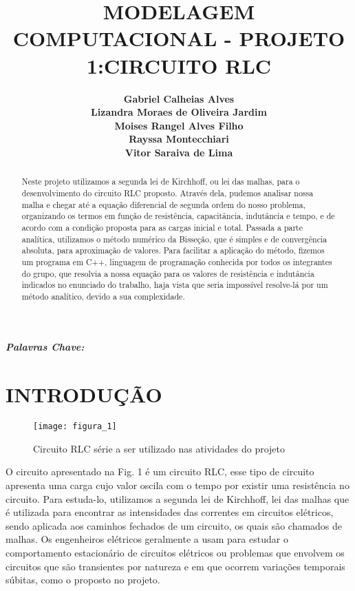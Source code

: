 \documentclass[12pt,fleqn]{article}
\title{MODELAGEM COMPUTACIONAL - PROJETO 1:CIRCUITO RLC}
\author
    {\rm \begin{tabular}{l} 
    \textbf{Gabriel Calheias Alves}\\
    \textbf{Lizandra Moraes de Oliveira Jardim}\\
    \textbf{Moises Rangel Alves Filho}\\
    \textbf{Rayssa Montecchiari}\\
    \textbf{Vitor Saraiva de Lima}\\
  \end{tabular}}
\begin{document}
\pagestyle{pagetstyle}
\maketitle
\thispagestyle{firspagetstyle}

\begin{abstract}
Neste projeto utilizamos a segunda lei de Kirchhoff, ou lei das malhas, para o desenvolvimento do circuito RLC proposto. Através dela, pudemos analisar nossa malha e chegar até a equação diferencial de segunda ordem do nosso problema, organizando os termos em função de resistência, capacitância, indutância e tempo, e de acordo com a condição proposta para as cargas inicial e total. Passada a parte analítica, utilizamos o método numérico da Bisseção, que é simples e de convergência absoluta, para aproximação de valores. Para facilitar a aplicação do método, fizemos um programa em C++, linguagem de programação conhecida por todos os integrantes do grupo, que resolvia a nossa equação para os valores de resistência e indutância indicados no enunciado do trabalho, haja vista que seria impossível resolve-lá por um método analítico, devido a sua complexidade.
\end{abstract}

\textbf{\textit{Palavras Chave:}} 

\pagestyle{fancy}

\section{INTRODUÇÃO}
\begin{figure}[H] %
\vspace{-2pt}
\begin{center}
\texttt{[image: figura\_1]}%
\caption{Circuito RLC série a ser utilizado nas atividades do projeto}
\label{fig1}%
\end{center}
\end{figure}
O circuito apresentado na Fig. 1 é um circuito RLC, esse tipo de circuito apresenta uma carga cujo valor oscila com o tempo por existir uma resistência no circuito. Para estuda-lo, utilizamos a segunda lei de Kirchhoff, lei das malhas que é utilizada para encontrar as intensidades das correntes em circuitos elétricos, sendo aplicada aos caminhos fechados de um circuito, os quais são chamados de malhas. Os engenheiros elétricos geralmente a usam para estudar o comportamento estacionário de circuitos elétricos ou problemas que envolvem os circuitos que são transientes por natureza e em que ocorrem variações temporais súbitas, como o proposto no projeto. 
\end{document}
